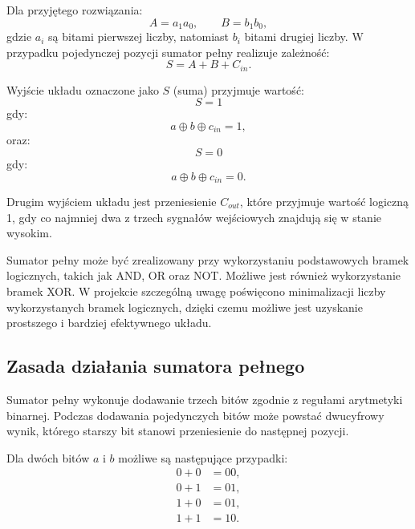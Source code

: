 \documentclass[12pt,a4paper]{article}
\begin{document}
Dla przyjętego rozwiązania:
\begin{equation*}
A = a_1a_0, \qquad B = b_1b_0,
\end{equation*}
gdzie $a_i$ są bitami pierwszej liczby, natomiast $b_i$ bitami drugiej liczby. W przypadku pojedynczej pozycji sumator pełny realizuje zależność:
\begin{equation*}
S = A + B + C_{in}.
\end{equation*}

Wyjście układu oznaczone jako $S$ (suma) przyjmuje wartość:
\begin{equation*}
S = 1
\end{equation*}
gdy:
\begin{equation*}
a \oplus b \oplus c_{in} = 1,
\end{equation*}
oraz:
\begin{equation*}
S = 0
\end{equation*}
gdy:
\begin{equation*}
a \oplus b \oplus c_{in} = 0.
\end{equation*}

Drugim wyjściem układu jest przeniesienie $C_{out}$, które przyjmuje wartość logiczną 1, gdy co najmniej dwa z trzech sygnałów wejściowych znajdują się w stanie wysokim.

Sumator pełny może być zrealizowany przy wykorzystaniu podstawowych bramek logicznych, takich jak AND, OR oraz NOT. Możliwe jest również wykorzystanie bramek XOR. W projekcie szczególną uwagę poświęcono minimalizacji liczby wykorzystanych bramek logicznych, dzięki czemu możliwe jest uzyskanie prostszego i bardziej efektywnego układu.

\subsection{Zasada działania sumatora pełnego}

Sumator pełny wykonuje dodawanie trzech bitów zgodnie z regułami arytmetyki binarnej. Podczas dodawania pojedynczych bitów może powstać dwucyfrowy wynik, którego starszy bit stanowi przeniesienie do następnej pozycji.

Dla dwóch bitów $a$ i $b$ możliwe są następujące przypadki:
\begin{align*}
0 + 0 &= 00, \\
0 + 1 &= 01, \\
1 + 0 &= 01, \\
1 + 1 &= 10.
\end{align*}
\end{document}
